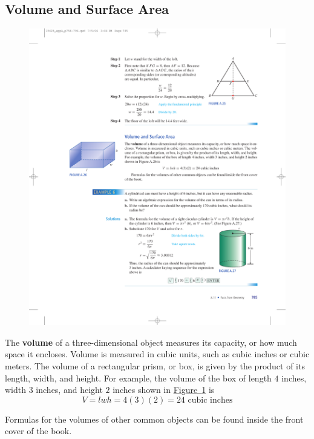 \documentclass[10pt,]{book}
\newcommand{\terminology}[1]{\textbf{#1}}
\theoremstyle{plain}
\theoremstyle{definition}
\theoremstyle{definition}
\theoremstyle{definition}
\numberwithin{equation}{part}
\begin{document}
\subsection[{Volume and Surface Area}]{Volume and Surface Area}\label{subsection-55}
\leavevmode%
\begin{figure}
\centering
\includegraphics[width=0.4\linewidth]{images/fig-box2}
\caption{\label{fig-box2}}
\end{figure}
 The \terminology{volume} of a three-dimensional object measures its capacity, or how much space it encloses. Volume is measured in cubic units, such as cubic inches or cubic meters. The volume of a rectangular prism, or box, is given by the product of its length, width, and height. For example, the volume of the box of length \(4\) inches, width \(3\) inches, and height \(2\) inches shown in \hyperref[fig-box2]{Figure~\ref{fig-box2}} is%
\begin{equation*}
V = lwh = 4(3)(2) = 24 \text{ cubic inches}
\end{equation*}
%
\par
Formulas for the volumes of other common objects can be found inside the front cover of the book.%
\end{document}
